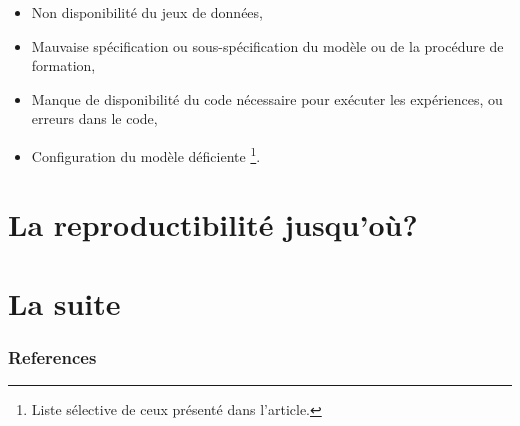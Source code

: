\documentclass{beamer}
\begin{document}
		\begin{frame}
			\begin{itemize}
				\item Non disponibilité du jeux de données,
				\item Mauvaise spécification ou sous-spécification du modèle ou de la procédure de formation,
				\item Manque de disponibilité du code nécessaire pour exécuter les expériences, ou erreurs dans le code,
				\item Configuration du modèle déficiente \cite{pineau2020improving}\footnote{Liste sélective de ceux présenté dans l'article.}.
			\end{itemize}
		\end{frame}
	
	\section{La reproductibilité jusqu'où?}
	
	\section{La suite}
	
	
	\begin{frame}[t, allowframebreaks]
		\frametitle{References}
		
		
	\end{frame}
	
\end{document}

